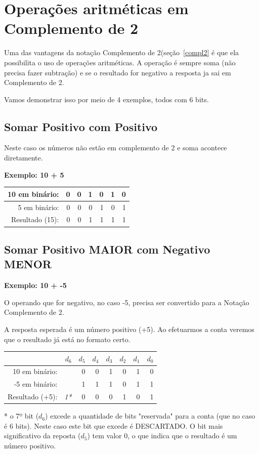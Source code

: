 \section{Operações aritméticas em Complemento de 2}
\label{aritmeticaCompl2}

Uma das vantagens da notação Complemento de 2(seção~\ref{compl2} é que ela possibilita o uso de operações aritméticas. A operação é sempre soma (não precisa fazer subtração) e se o resultado for negativo a resposta ja sai em Complemento de 2.

Vamos demonstrar isso por meio de 4 exemplos, todos com 6 bits.

\subsection{Somar Positivo com Positivo}
Neste caso os números não estão em complemento de 2 e soma acontece diretamente.

\noindent\textbf{Exemplo: 10 + 5}
\begin{table}[h]
	\centering
	\begin{tabular}{|r|r|r|r|r|r|r|}
		\hline
		10 em binário: 	& 0 & 0 & 1  & 0 & 1 & 0 \\
		\hline
		5 em binário:	& 0 & 0 & 0  & 1 & 0 & 1 \\
		\hline
		\hline
		Resultado (15):		& 0	& 0 & 1  &1	 & 1 & 1 \\
		\hline
	\end{tabular}
\end{table}


\subsection{Somar Positivo MAIOR com Negativo MENOR}

\noindent\textbf{Exemplo: 10 + -5}

O operando que for negativo, no caso -5, precisa ser convertido para a Notação Complemento de 2. 

A resposta esperada é um número positivo (+5). Ao efetuarmos a conta veremos que o resultado já está no formato certo.


\begin{table}[h]
	\centering
	\begin{tabular}{|r|r|r|r|r|r|r|r|}
		\hline
						& $d_6$ & $d_5$ & $d_4$ & $d_3$  & $d_2$ & $d_1$ & $d_0$ \\
		\hline
		10 em binário: 	&	& 0 & 0 & 1  & 0 & 1 & 0 \\
		\hline
		-5 em binário:	&	& 1 & 1 & 1  & 0 & 1 & 1 \\
		\hline
		\hline
		Resultado (+5):	& \textit{1*}  & 0	& 0 & 0  & 1 & 0 & 1 \\
		\hline
	\end{tabular}
\end{table}
* o 7º bit ($d_6$) excede a quantidade de bits "reservada" para a conta (que no caso é 6 bits). Neste caso este bit que excede é DESCARTADO. O bit mais significativo da reposta ($d_5$) tem valor 0, o que indica que o resultado é um número positivo.



